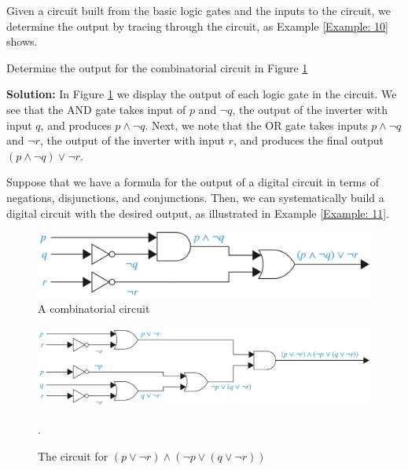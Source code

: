 \documentclass{Axon}
\begin{document}
Given a circuit built from the basic logic gates and the inputs to the circuit, we determine the output by tracing through the circuit, as Example \ref{Example: 10} shows.

\begin{example}\label{Example: 10}
    Determine the output for the combinatorial circuit in Figure \ref{Figure: 2}

    \noindent
    \textbf{Solution:}
    In Figure \ref{Figure: 2} we display the output of each logic gate in the circuit. We see that the AND gate takes input of \(p\) and \(\lnot q\), the output of the inverter with input \(q\), and produces \(p \land \lnot q\). Next, we note that the OR gate takes inputs \(p \land \lnot q\) and \(\lnot r\), the output of the inverter with input \(r\), and produces the final output \((p \land \lnot q) \lor \lnot r\).
\end{example}

Suppose that we have a formula for the output of a digital circuit in terms of negations, disjunctions, and conjunctions. Then, we can systematically build a digital circuit with the desired output, as illustrated in Example \ref{Example: 11}.
\begin{figure}[h]
    \centering
    \includegraphics[width=0.75\linewidth]{Discrete Mathematics and its Applications, 8th Edition/Chapter 1 Logic and Proofs/Section 1.2 Applications of Propositional Logic/Figure 2.png}
    \caption{A combinatorial circuit}
    \label{Figure: 2}
\end{figure}

\begin{figure}[ht]
    \centering
    \includegraphics[width=0.75\linewidth]{Discrete Mathematics and its Applications, 8th Edition/Chapter 1 Logic and Proofs/Section 1.2 Applications of Propositional Logic/Figure 3.png}
    \caption{The circuit for \((p \lor \lnot r) \land (\lnot p \lor (q \lor \lnot r))\)}.
    \label{Figure: 3}
\end{figure}
\end{document}
